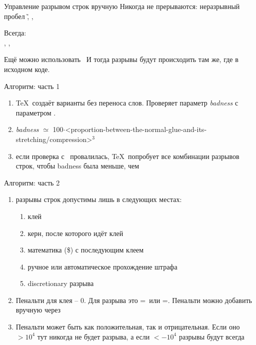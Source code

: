 {\begin{frame}{Управление разрывом строк вручную}
    Никогда не прерываются: неразрывный пробел \~, \ccol\nobreak, \ccol\nolinebreak
    
    Всегда: \ccol\\, \ccol\break, \ccol\linebreak
    
    Ещё можно использовать \ccol\obeylines\ И тогда разрывы будут происходить там же, где в исходном коде.
     
\end{frame}

\begin{frame}{Алгоритм: часть 1}\relax

    \begin{enumerate}
        \item \TeX\ создаёт варианты без переноса слов. Проверяет параметр \textit{badness} с параметром \ccol\pretolerance. 
        \item \textit{badness} $\simeq$ 100$\cdot$<proportion-between-the-normal-glue-and-its-stretching/compression>$^3$
        \item если проверка с \ccol\pretolerance\ провалилась, \TeX\ попробует все комбинации разрывов строк, чтобы badness была меньше, чем \ccol\tolerance
         
    \end{enumerate}
     
\end{frame}

\begin{frame}{Алгоритм: часть 2}\relax
    \footnotesize
    \begin{enumerate}
        \item разрывы строк допустимы лишь в следующих местах:
        \begin{enumerate}
            \item клей
            \item керн, после которого идёт клей 
            \item математика (\$) с последующим клеем
            \item ручное или автоматическое прохождение штрафа
            \item  discretionary разрыва
        \end{enumerate}
        \item Пенальти для клея -- $0$. Для разрыва это \ccol\hyphenpenalty=\ или \ccol\exhyphenpenalty=. Пенальти можно добавить вручную через \ccol\penalty
        \item Пенальти может быть как положительная, так и отрицательная. Если оно $>10^4$ тут никогда не будет разрыва, а если $<-10^4$ разрывы будут всегда
         

\end{enumerate}
\end{frame}}
